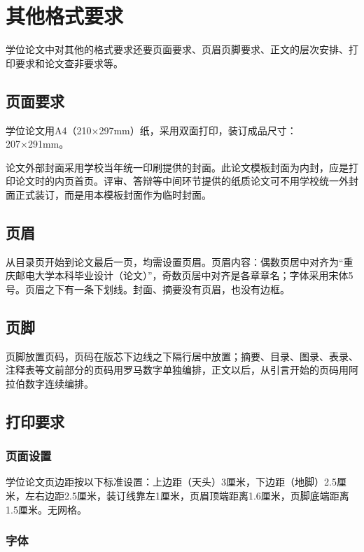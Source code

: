 \chapter{其他格式要求}

学位论文中对其他的格式要求还要页面要求、页眉页脚要求、正文的层次安排、打印要求和论文查非要求等。

\section{页面要求}

学位论文用A4（210×297mm）纸，采用双面打印，装订成品尺寸：207×291mm。

论文外部封面采用学校当年统一印刷提供的封面。此论文模板封面为内封，应是打印论文时的内页首页。评审、答辩等中间环节提供的纸质论文可不用学校统一外封面正式装订，而是用本模板封面作为临时封面。

\section{页眉}

从目录页开始到论文最后一页，均需设置页眉。页眉内容：偶数页居中对齐为“重庆邮电大学本科毕业设计（论文）”，奇数页居中对齐是各章章名；字体采用宋体5号。页眉之下有一条下划线。封面、摘要没有页眉，也没有边框。

\section{页脚}

页脚放置页码，页码在版芯下边线之下隔行居中放置；摘要、目录、图录、表录、注释表等文前部分的页码用罗马数字单独编排，正文以后，从引言开始的页码用阿拉伯数字连续编排。

\section{打印要求}
\subsection{页面设置}

学位论文页边距按以下标准设置：上边距（天头）3厘米，下边距（地脚）2.5厘米，左右边距2.5厘米，装订线靠左1厘米，页眉顶端距离1.6厘米，页脚底端距离1.5厘米。无网格。

\subsection{字体}

